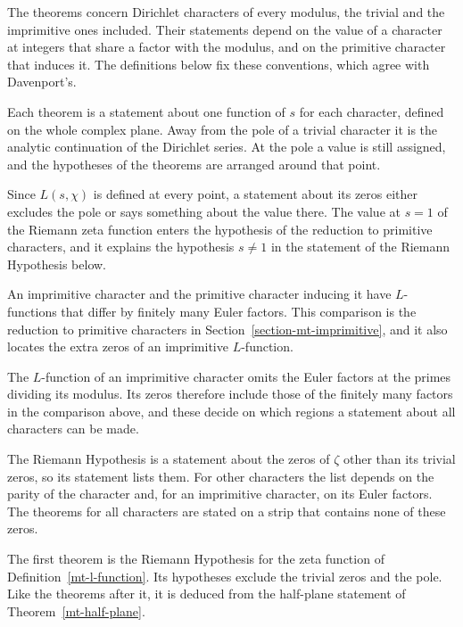 The theorems concern Dirichlet characters of every modulus, the trivial and the imprimitive ones
included. Their statements depend on the value of a character at integers that share a factor with
the modulus, and on the primitive character that induces it. The definitions below fix these
conventions, which agree with Davenport's.

Each theorem is a statement about one function of $s$ for each character, defined on the whole
complex plane. Away from the pole of a trivial character it is the analytic continuation of the
Dirichlet series. At the pole a value is still assigned, and the hypotheses of the theorems are
arranged around that point.

Since $L(s,\chi)$ is defined at every point, a statement about its zeros either excludes the pole or
says something about the value there. The value at $s=1$ of the Riemann zeta function enters the
hypothesis of the reduction to primitive characters, and it explains the hypothesis $s\neq1$ in the
statement of the Riemann Hypothesis below.

An imprimitive character and the primitive character inducing it have $L$-functions that differ by
finitely many Euler factors. This comparison is the reduction to primitive characters in
Section~\ref{section-mt-imprimitive}, and it also locates the extra zeros of an imprimitive
$L$-function.

The $L$-function of an imprimitive character omits the Euler factors at the primes dividing its
modulus. Its zeros therefore include those of the finitely many factors in the comparison above, and
these decide on which regions a statement about all characters can be made.

The Riemann Hypothesis is a statement about the zeros of $\zeta$ other than its trivial zeros, so
its statement lists them. For other characters the list depends on the parity of the character and,
for an imprimitive character, on its Euler factors. The theorems for all characters are stated on a
strip that contains none of these zeros.

The first theorem is the Riemann Hypothesis for the zeta function of
Definition~\ref{mt-l-function}. Its hypotheses exclude the trivial zeros and the pole. Like the
theorems after it, it is deduced from the half-plane statement of Theorem~\ref{mt-half-plane}.

